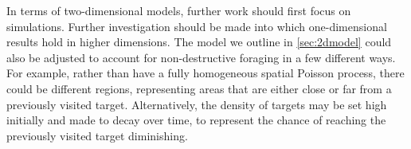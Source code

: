In terms of two-dimensional models, further work should first focus on simulations. Further investigation should be made into which one-dimensional results hold in higher dimensions. The model we outline in \cref{sec:2dmodel} could also be adjusted to account for non-destructive foraging in a few different ways. For example, rather than have a fully homogeneous spatial Poisson process, there could be different regions, representing areas that are either close or far from a previously visited target. Alternatively, the density of targets may be set high initially and made to decay over time, to represent the chance of reaching the previously visited target diminishing.
